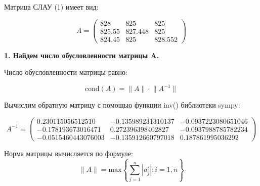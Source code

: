 \documentclass[a4paper, 12pt]{extarticle}
\begin{document}
Матрица СЛАУ (1) имеет вид:

\begin{equation}
    A = \begin{pmatrix}
        828    & 825     & 825 \\
        825.55 & 827.448 & 825 \\
        824.45 & 825     & 828.552
    \end{pmatrix}
\end{equation}

\textbf{1. Найдем число обусловленности матрицы A.}

Число обусловленности матрицы равно:

\begin{equation}
    \textrm{cond}(A) = \lVert A \rVert \cdot \lVert A^{-1} \rVert
\end{equation}

Вычислим обратную матрицу с помощью функции inv() библиотеки sympy:

\begin{equation}
    A^{-1} = \begin{pmatrix}
        0.230115056512510   & -0.135989231310137 & -0.0937223080651046 \\ 
        -0.178193673016471  & 0.272396398402827  & -0.0937988785782234 \\ 
        -0.0515460443076003 & -0.135912660797018 & 0.187861995036292 
    \end{pmatrix}
\end{equation}

Норма матрицы вычисляется по формуле:
\begin{equation}
    \lVert A \rVert = \textrm{max} \left\{ \sum_{j=1}^{n} |a^i_j|:i = \overline{1, n} \right\}
\end{equation}


\end{document}
